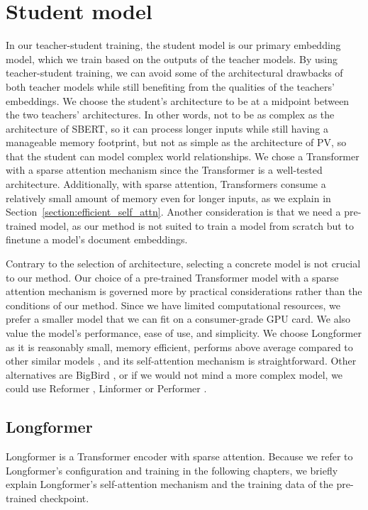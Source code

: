 \section{Student model}\label{section:student_model}

In our teacher-student training, the student model is our primary embedding
model, which we train based on the outputs of the teacher models. By using
teacher-student training, we can avoid some of the architectural drawbacks of
both teacher models while still benefiting from the qualities of the teachers'
embeddings. We choose the student's architecture to be at a midpoint between
the two teachers' architectures. In other words, not to be as complex as the
architecture of SBERT, so it can process longer inputs while still having a
manageable memory footprint, but not as simple as the architecture of PV, so
that the student can model complex world relationships. We chose a Transformer
with a sparse attention mechanism since the Transformer is a well-tested
architecture. Additionally, with sparse attention, Transformers consume a
relatively small amount of memory even for longer inputs, as we explain in
Section~\ref{section:efficient_self_attn}. Another consideration is that we
need a pre-trained model, as our method is not suited to train a model from
scratch but to finetune a model's document embeddings.

Contrary to the selection of architecture, selecting a concrete model is not
crucial to our method. Our choice of a pre-trained Transformer model with a
sparse attention mechanism is governed more by practical considerations rather
than the conditions of our method. Since we have limited computational
resources, we prefer a smaller model that we can fit on a consumer-grade GPU
card. We also value the model's performance, ease of use, and simplicity. We
choose Longformer \citep{beltagy2020longformer} as it is reasonably small,
memory efficient, performs above average compared to other similar models
\citep{tay2020long}, and its self-attention mechanism is straightforward. Other
alternatives are BigBird \citep{zaheer2020big}, or if we would not mind a more
complex model, we could use Reformer \citep{kitaev2020reformer}, Linformer
\citep{wang2020linformer} or Performer \citep{choromanski2020rethinking}.

\subsection{Longformer}

Longformer \citep{beltagy2020longformer} is a Transformer encoder with sparse
attention. Because we refer to Longformer's configuration and training in the
following chapters, we briefly explain Longformer's self-attention mechanism
and the training data of the pre-trained checkpoint.



